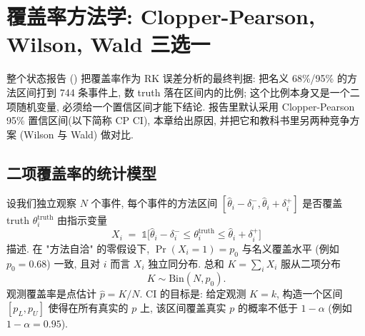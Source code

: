 %
%
%
%

\section{覆盖率方法学: Clopper-Pearson, Wilson, Wald 三选一}
\label{sec:partIII:coverage_methodology}

整个状态报告 (\StatusReport{}) 把覆盖率作为 RK 误差分析的最终判据: 把名义 68\%/95\% 的方法区间打到 744 条事件上, 数 truth 落在区间内的比例; 这个比例本身又是一个二项随机变量, 必须给一个置信区间才能下结论. 报告里默认采用 Clopper-Pearson 95\% 置信区间(以下简称 CP CI), 本章给出原因, 并把它和教科书里另两种竞争方案 (Wilson 与 Wald) 做对比.

\subsection{二项覆盖率的统计模型}
\label{sec:partIII:coverage_methodology:model}

设我们独立观察 $N$ 个事件, 每个事件的方法区间 $[\hat{\theta}_i - \delta_i^-, \hat{\theta}_i + \delta_i^+]$ 是否覆盖 truth $\theta_i^{\mathrm{truth}}$ 由指示变量
\[
  X_i \;=\; \mathbb{1}\bigl[\hat\theta_i - \delta_i^- \le \theta_i^{\mathrm{truth}} \le \hat\theta_i + \delta_i^+\bigr]
\]
描述. 在 "方法自洽" 的零假设下, $\Pr(X_i = 1) = p_0$ 与名义覆盖水平 (例如 $p_0 = 0.68$) 一致, 且对 $i$ 而言 $X_i$ 独立同分布. 总和 $K = \sum_i X_i$ 服从二项分布
\[
  K \sim \mathrm{Bin}(N, p_0).
\]
观测覆盖率是点估计 $\hat p = K / N$. CI 的目标是: 给定观测 $K = k$, 构造一个区间 $[p_L, p_U]$ 使得在所有真实的 $p$ 上, 该区间覆盖真实 $p$ 的概率不低于 $1 - \alpha$ (例如 $1 - \alpha = 0.95$).

